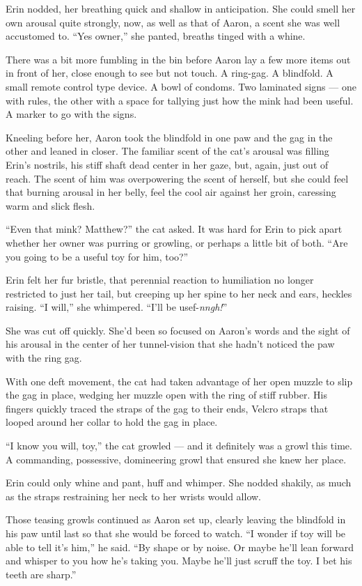 Erin nodded, her breathing quick and shallow in anticipation. She could smell her own arousal quite strongly, now, as well as that of Aaron, a scent she was well accustomed to. ``Yes owner,'' she panted, breaths tinged with a whine.

There was a bit more fumbling in the bin before Aaron lay a few more items out in front of her, close enough to see but not touch. A ring-gag. A blindfold. A small remote control type device. A bowl of condoms. Two laminated signs --- one with rules, the other with a space for tallying just how the mink had been useful. A marker to go with the signs.

Kneeling before her, Aaron took the blindfold in one paw and the gag in the other and leaned in closer. The familiar scent of the cat's arousal was filling Erin's nostrils, his stiff shaft dead center in her gaze, but, again, just out of reach. The scent of him was overpowering the scent of herself, but she could feel that burning arousal in her belly, feel the cool air against her groin, caressing warm and slick flesh.

``Even that mink? Matthew?'' the cat asked. It was hard for Erin to pick apart whether her owner was purring or growling, or perhaps a little bit of both. ``Are you going to be a useful toy for him, too?''

Erin felt her fur bristle, that perennial reaction to humiliation no longer restricted to just her tail, but creeping up her spine to her neck and ears, heckles raising. ``I will,'' she whimpered. ``I'll be usef-\emph{nngh!}''

She was cut off quickly. She'd been so focused on Aaron's words and the sight of his arousal in the center of her tunnel-vision that she hadn't noticed the paw with the ring gag.

With one deft movement, the cat had taken advantage of her open muzzle to slip the gag in place, wedging her muzzle open with the ring of stiff rubber. His fingers quickly traced the straps of the gag to their ends, Velcro straps that looped around her collar to hold the gag in place.

``I know you will, toy,'' the cat growled --- and it definitely was a growl this time. A commanding, possessive, domineering growl that ensured she knew her place.

Erin could only whine and pant, huff and whimper. She nodded shakily, as much as the straps restraining her neck to her wrists would allow.

Those teasing growls continued as Aaron set up, clearly leaving the blindfold in his paw until last so that she would be forced to watch. ``I wonder if toy will be able to tell it's him,'' he said. ``By shape or by noise. Or maybe he'll lean forward and whisper to you how he's taking you. Maybe he'll just scruff the toy. I bet his teeth are sharp.''

